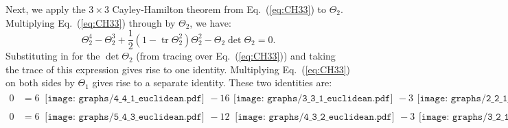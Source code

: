 \documentclass[aps,prd,floatfix,preprintnumbers,twocolumn,groupedaddress,nofootinbib,longbibliography,10pt]{revtex4-1}
\DeclareMathOperator{\tr}{tr}
\DeclareRobustCommand{\Eq}[1]{Eq.~(\ref{#1})}
\begin{document}
Next, we apply the $3\times3$ Cayley-Hamilton theorem from \Eq{eq:CH33} to $\Theta_2$.
%
Multiplying \Eq{eq:CH33} through by $\Theta_2$, we have:
\begin{equation}
\Theta_2^4 - \Theta_2^3 + \frac12(1 - \tr\Theta_2^2)\Theta_2^2 - \Theta_2\det \Theta_2 = 0.
\end{equation}
%
Substituting in for the $\det\Theta_2$ (from tracing over \Eq{eq:CH33}) and taking the trace of this expression gives rise to one identity.
%
Multiplying \Eq{eq:CH33} on both sides by $\Theta_1$ gives rise to a separate identity.
%
These two identities are:
\begin{align}\label{eq:sphid1}
0 &=6\, \begin{gathered}\texttt{[image: graphs/4\_4\_1\_euclidean.pdf]}\end{gathered}
 - 16 \begin{gathered}\texttt{[image: graphs/3\_3\_1\_euclidean.pdf]}\end{gathered}
- 3\begin{gathered}\texttt{[image: graphs/2\_2\_1\_euclidean.pdf]}\end{gathered}\begin{gathered}\texttt{[image: graphs/2\_2\_1\_euclidean.pdf]}\end{gathered}
+ 24 \begin{gathered}\texttt{[image: graphs/2\_2\_1\_euclidean.pdf]}\end{gathered} - 16, \\
0 & = 6\, \begin{gathered}\texttt{[image: graphs/5\_4\_3\_euclidean.pdf]}\end{gathered}
- 12\, \begin{gathered}\texttt{[image: graphs/4\_3\_2\_euclidean.pdf]}\end{gathered}
- 3  \begin{gathered}\texttt{[image: graphs/3\_2\_1\_euclidean.pdf]}\end{gathered}\begin{gathered}\texttt{[image: graphs/2\_2\_1\_euclidean.pdf]}\end{gathered}
-2  \begin{gathered}\texttt{[image: graphs/3\_3\_1\_euclidean.pdf]}\end{gathered}\begin{gathered}\texttt{[image: graphs/2\_1\_1\_euclidean.pdf]}\end{gathered}

\end{align}
\end{document}

